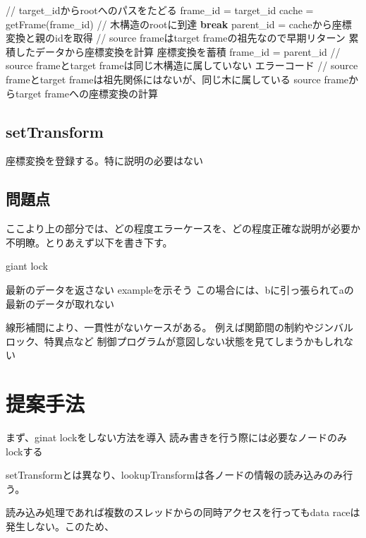 \documentclass{article}
\begin{document}
\begin{multicols}{2}
\begin{algorithm}[H]
\begin{algorithmic}
	\STATE // target\_idからrootへのパスをたどる
	\STATE frame\_id = target\_id
	\STATE cache = getFrame(frame\_id)
	\STATE // 木構造のrootに到達
	\STATE \textbf{break}
	\ENDIF
	\STATE parent\_id = cacheから座標変換と親のidを取得
	\STATE // source frameはtarget frameの祖先なので早期リターン
	\STATE 累積したデータから座標変換を計算
	\ENDIF
	\STATE 座標変換を蓄積
	\STATE frame\_id = parent\_id
	\ENDWHILE
	\STATE // source frameとtarget frameは同じ木構造に属していない
	\RETURN エラーコード
	\ENDIF
	\STATE // source frameとtarget frameは祖先関係にはないが、同じ木に属している
	\STATE source frameからtarget frameへの座標変換の計算
	\end{algorithmic}
\end{algorithm}




\subsection{setTransform}

座標変換を登録する。特に説明の必要はない

\subsection{問題点}

ここより上の部分では、どの程度エラーケースを、どの程度正確な説明が必要か不明瞭。とりあえず以下を書き下す。

giant lock

最新のデータを返さない
exampleを示そう
%
この場合には、bに引っ張られてaの最新のデータが取れない

線形補間により、一貫性がないケースがある。
例えば関節間の制約やジンバルロック、特異点など
制御プログラムが意図しない状態を見てしまうかもしれない

\section{提案手法}

まず、ginat lockをしない方法を導入
読み書きを行う際には必要なノードのみlockする

setTransformとは異なり、lookupTransformは各ノードの情報の読み込みのみ行う。

読み込み処理であれば複数のスレッドからの同時アクセスを行ってもdata raceは発生しない。このため、



\end{multicols}
\end{document}
